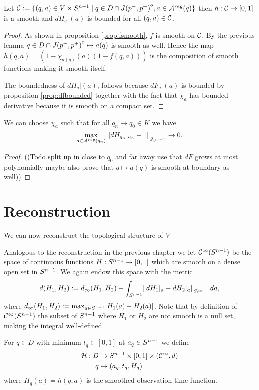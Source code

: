 \begin{corollary}\label{cor:hsmooth}
    Let ${\mathcal{C}}:=\{(q,a)\in V\times {S^{n-1}} \mid q \in D\cap {\kern0ptJ(p^-,p^+)}^{\mathrm{o}}, a\in {{\mathcal{A}}^{reg}}(q)\}$ then $h:{\mathcal{C}}\to [0,1]$ is a smooth and $dH_q\rvert(a)$ is bounded for all $(q,a)\in {\mathcal{C}}$.
\end{corollary}
\begin{proof}
    As shown in proposition \ref{prop:fsmooth}, $f$ is smooth on ${\mathcal{C}}$. By the previous lemma $q\in D\cap {\kern0ptJ(p^-,p^+)}^{\mathrm{o}}\mapsto a(q)$ is smooth as well.
    Hence the map $h(q,a) = (1-\chi_{a(q)}(a)(1-f(q,a)))$ is the composition of smooth functions making it smooth itself.

    The boundedness of $dH_q\rvert(a)$, follows because $dF_q\rvert(a)$ is bounded by proposition \ref{prop:dfbounded} together with the fact that $\chi_{a}$ has bounded derivative because it is smooth on a compact set.
\end{proof}

\begin{lemma}\label{lem:dhconvonboundary}
    We can choose $\chi_a$ such that for all $q_n \to q_0\in K$ we have
    \[
        \max_{a\in {{\mathcal{A}}^{reg}}(q_n)} \left\lVert dH_{q_n}\rvert_{a_n}-1\right\rVert_{g_{S^{n-1}}}\to 0.
    \]
\end{lemma}
\begin{proof}
    ((Todo split up in close to $q_0$ and far away use that $dF$ grows at most polynomially maybe also prove that $q\mapsto a(q)$ is smooth at boundary as well))
\end{proof}

\section{Reconstruction}
We can now reconstruct the topological structure of $V$

Analogous to the reconstruction in the previous chapter we let ${\mathcal{C}}^{\infty}({S^{n-1}})$ be the space of continuous functions $H:{S^{n-1}} \to [0,1]$ which are smooth on a dense open set in ${S^{n-1}}$. We again endow this space with the metric 
\[
    d(H_1,H_2):= d_\infty(H_1,H_2) + \int_{{S^{n-1}}} \lVert dH_1\rvert_a - dH_2\rvert_a \rVert_{g_{S^{n-1}}}da,
\] where $d_\infty(H_1,H_2):=\max_{a\in {S^{n-1}}}\lvert H_1(a)-H_2(a)\rvert$.
Note that by definition of ${\mathcal{C}}^\infty({S^{n-1}})$ the subset of ${S^{n-1}}$ where $H_1$ or $H_2$ are not smooth is a null set, making the integral well-defined.

For $q\in D$ with minimum $t_q\in [0,1]$ at $a_q\in {S^{n-1}}$ we define
\begin{align*}
    \mathcal{H}:D &\to {S^{n-1}}\times [0,1]\times({\mathcal{C}}^\infty, d)\\
    q&\mapsto (a_q,t_q, H_q)
\end{align*} where $H_q(a)=h(q,a)$ is the smoothed observation time function.

